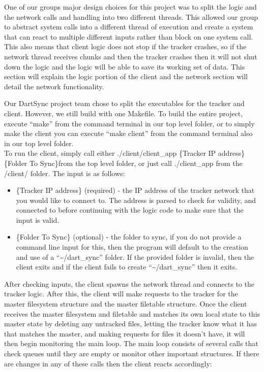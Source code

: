 	
	One of our groups major design choices for this project was to split the logic and the network calls and handling into two different threads.  This allowed our group to abstract system calls into a different thread of execution and create a system that can react to multiple different inputs rather than block on one system call.  This also means that client logic does not stop if the tracker crashes, so if the network thread receives chunks and then the tracker crashes then it will not shut down the logic and the logic will be able to save its working set of data.  This section will explain the logic portion of the client and the network section will detail the network functionality.


	Our DartSync project team chose to split the executables for the tracker and client.  However, we still build with one Makefile.  To build the entire project, execute ``make'' from the command terminal in our top level folder, or to simply make the client you can execute ``make client'' from the command terminal also in our top level folder.  \\

	To run the client, simply call either ./client/client_app \{Tracker IP address\} \{Folder To Sync\}from the top level folder, or just call ./client_app from the /client/ folder.  The input is as follows:
	
	\begin{itemize}
		\item \{Tracker IP address\} (required) - the IP address of the tracker network that you would like to connect to.  The address is parsed to check for validity, and connected to before continuing with the logic code to make sure that the input is valid.
		\item \{Folder To Sync\} (optional) - the folder to sync, if you do not provide a command line input for this, then the program will default to the creation and use of a ``\textasciitilde/dart_sync'' folder.  If the provided folder is invalid, then the client exits and if the client fails to create ``\textasciitilde/dart_sync'' then it exits.
	\end{itemize}


	After checking inputs, the client spawns the network thread and connects to the tracker logic. After this, the client will make requests to the tracker for the master filesystem structure and the master filetable structure. Once the client receives the master filesystem and filetable and matches its own local state to this master state by deleting any untracked files, letting the tracker know what it has that matches the master, and making requests for files it doesn't have, it will then begin monitoring the main loop.  The main loop consists of several calls that check queues until they are empty or monitor other important structures.  If there are changes in any of these calls then the client reacts accordingly:

